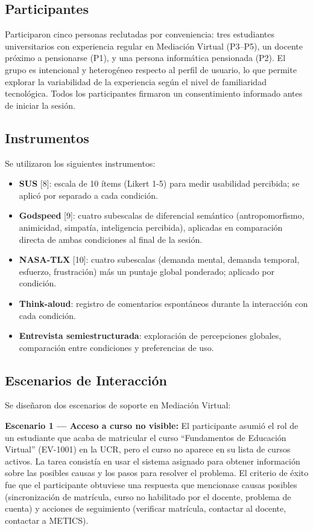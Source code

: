 \documentclass[conference]{IEEEtran}
\begin{document}
\subsection{Participantes}
Participaron cinco personas reclutadas por conveniencia: tres estudiantes universitarios con experiencia regular en Mediación Virtual (P3--P5), un docente próximo a pensionarse (P1), y una persona informática pensionada (P2). El grupo es intencional y heterogéneo respecto al perfil de usuario, lo que permite explorar la variabilidad de la experiencia según el nivel de familiaridad tecnológica. Todos los participantes firmaron un consentimiento informado antes de iniciar la sesión.

\subsection{Instrumentos}
Se utilizaron los siguientes instrumentos:
\begin{itemize}
  \item \textbf{SUS} [8]: escala de 10 ítems (Likert 1-5) para medir usabilidad percibida; se aplicó por separado a cada condición.
  \item \textbf{Godspeed} [9]: cuatro subescalas de diferencial semántico (antropomorfismo, animicidad, simpatía, inteligencia percibida), aplicadas en comparación directa de ambas condiciones al final de la sesión.
  \item \textbf{NASA-TLX} [10]: cuatro subescalas (demanda mental, demanda temporal, esfuerzo, frustración) más un puntaje global ponderado; aplicado por condición.
  \item \textbf{Think-aloud}: registro de comentarios espontáneos durante la interacción con cada condición.
  \item \textbf{Entrevista semiestructurada}: exploración de percepciones globales, comparación entre condiciones y preferencias de uso.
\end{itemize}

\subsection{Escenarios de Interacción}
Se diseñaron dos escenarios de soporte en Mediación Virtual:

\textbf{Escenario 1 --- Acceso a curso no visible:} El participante asumió el rol de un estudiante que acaba de matricular el curso ``Fundamentos de Educación Virtual'' (EV-1001) en la UCR, pero el curso no aparece en su lista de cursos activos. La tarea consistía en usar el sistema asignado para obtener información sobre las posibles causas y los pasos para resolver el problema. El criterio de éxito fue que el participante obtuviese una respuesta que mencionase causas posibles (sincronización de matrícula, curso no habilitado por el docente, problema de cuenta) y acciones de seguimiento (verificar matrícula, contactar al docente, contactar a METICS).
\end{document}
